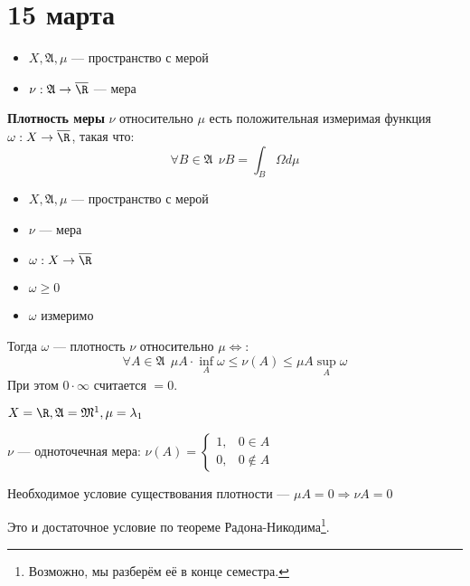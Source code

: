 \chapter{15 марта}

\begin{definition}\itemfix
    \begin{itemize}
        \item \(X, \mathfrak{A}, \mu\) --- пространство с мерой
        \item \(\nu : \mathfrak{A} \to \overline \R\) --- мера
    \end{itemize}

    \textbf{Плотность меры} \(\nu\) относительно \(\mu\) есть положительная измеримая функция \(\omega : X \to \overline \R\), такая что:
    \[\forall B\in \mathfrak{A} \ \ \nu B = \int_B \Omega d\mu\]
\end{definition}

\begin{theorem}\itemfix
    \label{критерий плотности}
    \begin{itemize}
        \item \(X, \mathfrak{A}, \mu\) --- пространство с мерой
        \item \(\nu\) --- мера
        \item \(\omega : X \to \overline\R\)
        \item \(\omega \geq 0\)
        \item \(\omega\) измеримо
    \end{itemize}

    Тогда \(\omega\) --- плотность \(\nu\) относительно \(\mu \Leftrightarrow\):
    \[\forall A\in \mathfrak{A} \ \ \mu A \cdot \inf_A \omega \leq \nu(A) \leq \mu A \sup_A \omega\]
    При этом \(0\cdot \infty\) считается \( = 0\).
\end{theorem}

\begin{example}
    \(X = \R, \mathfrak{A} = \mathfrak{M}^1, \mu = \lambda_1\)

    \(\nu\) --- одноточечная мера: \(\nu(A) =\begin{cases}
        1, & 0\in A     \\
        0, & 0\notin A
    \end{cases}\)

    Необходимое условие существования плотности --- \(\mu A = 0 \Rightarrow \nu A = 0\)

    Это и достаточное условие по теореме Радона-Никодима\footnote{Возможно, мы разберём её в конце семестра.}.
\end{example}

